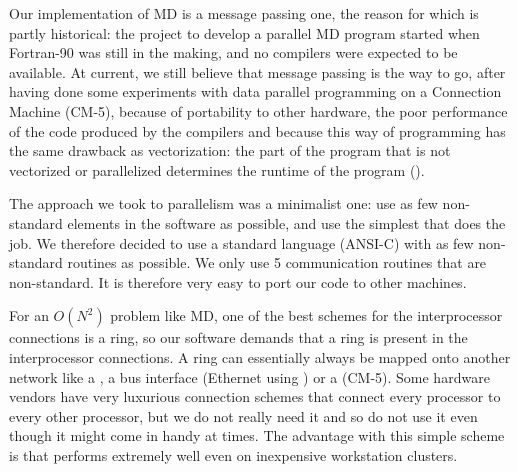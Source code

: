Our implementation of MD is a message passing one, the reason for which
is partly historical: the project to develop a parallel MD program started
when Fortran-90 was still in the making, and no compilers were
expected to be available. 
At current, we still believe that message passing is the way
to go, after having done some experiments with data parallel programming on a
Connection Machine (CM-5), because of portability to other hardware,
the poor performance of the code produced by the compilers 
and because this way of programming
has the same drawback as vectorization: the part of the program that is
not vectorized or parallelized determines the runtime of the program
().

The approach we took to parallelism was a minimalist one: use as few
non-standard elements in the software as possible, and use the
simplest  that does the job. We therefore 
decided to use a standard language (ANSI-C) with as few non-standard
routines as possible. We only use 5 communication routines that are
non-standard. It is therefore very easy to port our code to other machines.

For an $O(N^2)$ problem like MD, one of the best schemes for the
interprocessor connections is a ring, so our software demands that a
ring is present in the interprocessor connections. A ring can essentially
always be mapped onto another network like a , a
bus interface (Ethernet {\eg} using 
 ) or 
a 
(CM-5). Some hardware vendors have very luxurious connection schemes
that connect every processor to every other processor, but we do not
really need it and so do not use it even though it might come in handy
at times. The advantage with this simple scheme is that {\gromacs}
performs extremely well even on inexpensive workstation clusters.


